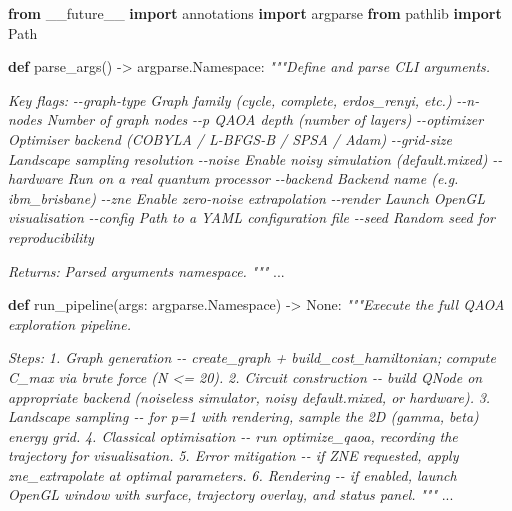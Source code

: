 \documentclass[
  11pt,
]{report}
\newenvironment{Shaded}{}{}
\newcommand{\CommentTok}[1]{\textcolor[rgb]{0.38,0.63,0.69}{\textit{#1}}}
\newcommand{\ImportTok}[1]{\textcolor[rgb]{0.00,0.50,0.00}{\textbf{#1}}}
\newcommand{\KeywordTok}[1]{\textcolor[rgb]{0.00,0.44,0.13}{\textbf{#1}}}
\newcommand{\NormalTok}[1]{#1}
\newcommand{\OperatorTok}[1]{\textcolor[rgb]{0.40,0.40,0.40}{#1}}
\newcommand{\VariableTok}[1]{\textcolor[rgb]{0.10,0.09,0.49}{#1}}
\begin{document}
\begin{Shaded}
\begin{Highlighting}[]
\ImportTok{from}\NormalTok{ \_\_future\_\_ }\ImportTok{import}\NormalTok{ annotations}
\ImportTok{import}\NormalTok{ argparse}
\ImportTok{from}\NormalTok{ pathlib }\ImportTok{import}\NormalTok{ Path}


\KeywordTok{def}\NormalTok{ parse\_args() }\OperatorTok{{-}\textgreater{}}\NormalTok{ argparse.Namespace:}
    \CommentTok{"""Define and parse CLI arguments.}

\CommentTok{    Key flags:}
\CommentTok{        {-}{-}graph{-}type    Graph family (cycle, complete, erdos\_renyi, etc.)}
\CommentTok{        {-}{-}n{-}nodes       Number of graph nodes}
\CommentTok{        {-}{-}p             QAOA depth (number of layers)}
\CommentTok{        {-}{-}optimizer     Optimiser backend (COBYLA / L{-}BFGS{-}B / SPSA / Adam)}
\CommentTok{        {-}{-}grid{-}size     Landscape sampling resolution}
\CommentTok{        {-}{-}noise         Enable noisy simulation (default.mixed)}
\CommentTok{        {-}{-}hardware      Run on a real quantum processor}
\CommentTok{        {-}{-}backend       Backend name (e.g. ibm\_brisbane)}
\CommentTok{        {-}{-}zne           Enable zero{-}noise extrapolation}
\CommentTok{        {-}{-}render        Launch OpenGL visualisation}
\CommentTok{        {-}{-}config        Path to a YAML configuration file}
\CommentTok{        {-}{-}seed          Random seed for reproducibility}

\CommentTok{    Returns:}
\CommentTok{        Parsed arguments namespace.}
\CommentTok{    """}
\NormalTok{    ...}


\KeywordTok{def}\NormalTok{ run\_pipeline(args: argparse.Namespace) }\OperatorTok{{-}\textgreater{}} \VariableTok{None}\NormalTok{:}
    \CommentTok{"""Execute the full QAOA exploration pipeline.}

\CommentTok{    Steps:}
\CommentTok{        1. Graph generation {-}{-} create\_graph + build\_cost\_hamiltonian;}
\CommentTok{           compute C\_max via brute force (N \textless{}= 20).}
\CommentTok{        2. Circuit construction {-}{-} build QNode on appropriate backend}
\CommentTok{           (noiseless simulator, noisy default.mixed, or hardware).}
\CommentTok{        3. Landscape sampling {-}{-} for p=1 with rendering, sample the}
\CommentTok{           2D (gamma, beta) energy grid.}
\CommentTok{        4. Classical optimisation {-}{-} run optimize\_qaoa, recording the}
\CommentTok{           trajectory for visualisation.}
\CommentTok{        5. Error mitigation {-}{-} if ZNE requested, apply zne\_extrapolate}
\CommentTok{           at optimal parameters.}
\CommentTok{        6. Rendering {-}{-} if enabled, launch OpenGL window with surface,}
\CommentTok{           trajectory overlay, and status panel.}
\CommentTok{    """}
\NormalTok{    ...}
\end{Highlighting}
\end{Shaded}
\end{document}
